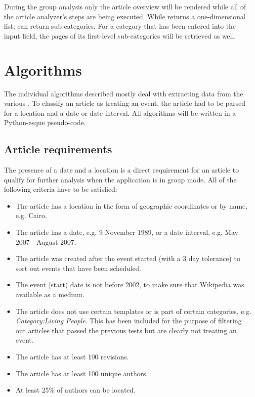 During the group analysis only the article overview will be rendered while all of the article analyzer's steps are being executed.
While  returns a one-dimensional list,  can return sub-categories.
For a category that has been entered into the input field, the pages of its first-level sub-categories will be retrieved as well.


\section{Algorithms}\label{sec:algorithms}

The individual algorithms described mostly deal with extracting data from the various .
To classify an article as treating an event, the article had to be parsed for a location and a date or date interval.
All algorithms will be written in a Python-esque pseudo-code.

\subsection{Article requirements}\label{sub:articlerequirements}

The presence of a date and a location is a direct requirement for an article to qualify for further analysis when the application is in group mode.
All of the following criteria have to be satisfied:

\begin{itemize}
  \item The article has a location in the form of geographic coordinates or by name, e.g. Cairo.
  \item The article has a date, e.g. 9 November 1989, or a date interval, e.g. May 2007 - August 2007.
  \item The article was created after the event started (with a 3 day tolerance) to sort out events that have been scheduled.
  \item The event (start) date is not before 2002, to make sure that Wikipedia was available as a medium. 
  \item The article does not use certain templates or is part of certain categories, e.g. \emph{Category:Living People}.
  This has been included for the purpose of filtering out articles that passed the previous tests but are clearly not treating an event. 
  \item The article has at least 100 revisions.
  \item The article has at least 100 unique authors.
  \item At least 25\% of authors can be located.
\end{itemize}

